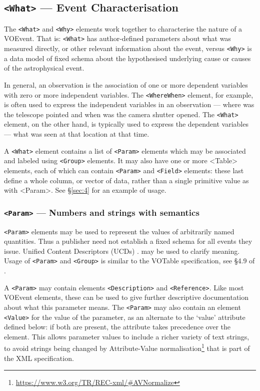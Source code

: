 \documentclass[11pt,a4paper]{ivoa}
\begin{document}
\subsection{{\tt <What>} --- Event Characterisation}
\label{sec:3.3}
The {\tt <What>} and {\tt <Why>} elements work together to characterise the 
nature of a VOEvent. That is: {\tt <What>} has author-defined parameters about 
what was measured directly, or other relevant information about the event, 
versus {\tt <Why>} is a data model of fixed schema about the hypothesised 
underlying cause or causes of the astrophysical event. 

In general, an observation is the association of one or more dependent variables 
with zero or more independent variables. The {\tt <WhereWhen>} element, for 
example, is often used to express the independent variables in an observation 
--- where was the telescope pointed and when was the camera shutter opened. The 
{\tt <What>} element, on the other hand, is typically used to express the 
dependent variables --- what was seen at that location at that time. 

A {\tt <What>} element contains a list of {\tt <Param>} elements which may be 
associated and labeled using {\tt <Group>} elements. It may also have one or 
more <Table> elements, each of which can contain {\tt <Param>} and {\tt <Field>} 
elements: these last define a whole column, or vector of data, rather than a 
single primitive value as with <Param>. See \S\ref{sec:4} for an example of 
usage. 

\subsubsection{{\tt <Param>} --- Numbers and strings with semantics}
\label{sec:3.3.1}
{\tt <Param>} elements may be used to represent the values of arbitrarily named 
quantities. Thus a publisher need not establish a fixed schema for all events 
they issue. Unified Content Descriptors (UCDs) \citep{2018ivoa.spec.0527M}.
may be used to clarify meaning. Usage of {\tt <Param>} and {\tt <Group>} is 
similar to the VOTable specification, see \S4.9 of \citep{2019ivoa.spec.1021O}. 

A {\tt <Param>} may contain elements {\tt <Description>} and {\tt <Reference>}. 
Like most VOEvent elements, these can be used to give further descriptive 
documentation about what this parameter means. The {\tt <Param>} may also 
contain an element {\tt <Value>} for the value of the parameter, as an alternate 
to the `value' attribute defined below: if both are present, the attribute takes 
precedence over the element. This allows parameter values to include a richer 
variety of text strings, to avoid strings being changed by Attribute-Value 
normalisation\footnote{\url{https://www.w3.org/TR/REC-xml/\#AVNormalize}} that 
is part of the XML specification. 
\end{document}

